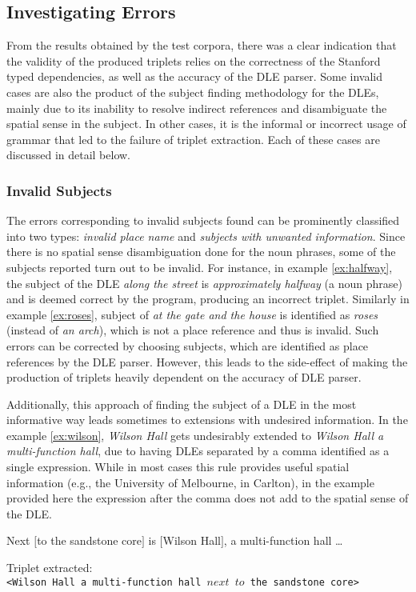 \documentclass[letter]{sig-alternate}
\begin{document}
\subsection{Investigating Errors}
From the results obtained by the test corpora, there was a clear indication that the validity of the produced triplets relies on the correctness of the Stanford typed dependencies, as well as the accuracy of the DLE parser. Some invalid cases are also the product of the subject finding methodology for the DLEs, mainly due to its inability to resolve indirect references and disambiguate the spatial sense in the subject. In other cases, it is the informal or incorrect usage of grammar that led to the failure of triplet extraction. Each of these cases are discussed in detail below. 
\subsubsection{Invalid Subjects}
The errors corresponding to invalid subjects found can be prominently classified into two types: \textit{invalid place name} and \textit{subjects with unwanted information}. Since there is no spatial sense disambiguation done for the noun phrases, some of the subjects reported turn out to be invalid. For instance, in example \ref{ex:halfway}, the subject of the DLE \textit{along the street} is \textit{approximately halfway} (a noun phrase) and is deemed correct by the program, producing an incorrect triplet. Similarly in example \ref{ex:roses}, subject of \textit{at the gate and the house} is identified as \textit{roses} (instead of \textit{an arch}), which is not a place reference and thus is invalid. Such errors can be corrected by choosing subjects, which are identified as place references by the DLE parser. However, this leads to the side-effect of making the production of triplets heavily dependent on the accuracy of DLE parser.

Additionally, this approach of finding the subject of a DLE in the most informative way leads sometimes to extensions with undesired information. In the example \ref{ex:wilson}, \textit{Wilson Hall} gets undesirably extended to \textit{Wilson Hall a multi-function hall}, due to having DLEs separated by a comma identified as a single expression. While in most cases this rule provides useful spatial information (e.g., the University of Melbourne, in Carlton), in the example provided here the expression after the comma does not add to the spatial sense of the DLE.\vspace{-0.05in}
\begin{example}
\label{ex:wilson}
Next $[$to the sandstone core$]$ is $[$Wilson Hall$]$, a multi-function hall \dots \vspace{-0.05in}
\end{example}
Triplet extracted:\\
\texttt{<Wilson Hall a multi-function hall $next$ $to$ the sandstone core>} 
\end{document}

